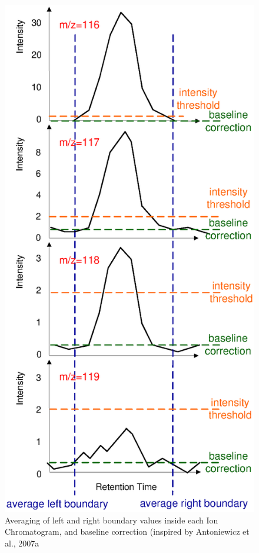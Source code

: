 \begin{figure}
  \begin{center}
    \includegraphics[scale=1]{graphics/chapter08/88.eps}
  \end{center}
  \caption{Averaging of left and right boundary values inside each Ion Chromatogram, and baseline correction (inspired by Antoniewicz et al., 2007a}
  \label{fig:88}
\end{figure}

